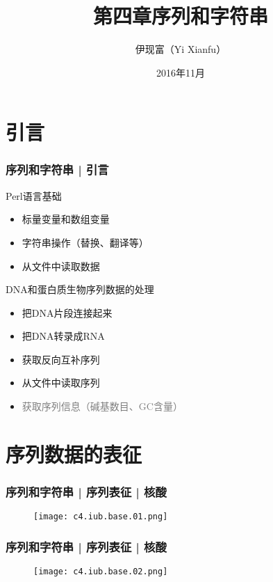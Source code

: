 


\title[序列和字符串]{第四章\quad 序列和字符串}
\author[Yixf]{伊现富（Yi Xianfu）}
\date{2016年11月}




\section{引言}
\begin{frame}
  \frametitle{序列和字符串 | 引言}
  \begin{block}{Perl语言基础}
    \begin{itemize}
      \item 标量变量和数组变量
      \item 字符串操作（替换、翻译等）
      \item 从文件中读取数据
    \end{itemize}
  \end{block}
  \pause
  \begin{block}{DNA和蛋白质生物序列数据的处理}
    \begin{itemize}
      \item 把DNA片段连接起来
      \item 把DNA转录成RNA
      \item 获取反向互补序列
      \item 从文件中读取序列
      \item \textcolor{gray}{获取序列信息（碱基数目、GC含量）}
    \end{itemize}
  \end{block}
\end{frame}

\section{序列数据的表征}
\begin{frame}
  \frametitle{序列和字符串 | 序列表征 | 核酸}
  \begin{figure}
    \centering
    \texttt{[image: c4.iub.base.01.png]}
  \end{figure}
\end{frame}

\begin{frame}
  \frametitle{序列和字符串 | 序列表征 | 核酸}
  \begin{figure}
    \centering
    \texttt{[image: c4.iub.base.02.png]}
  \end{figure}
\end{frame}


